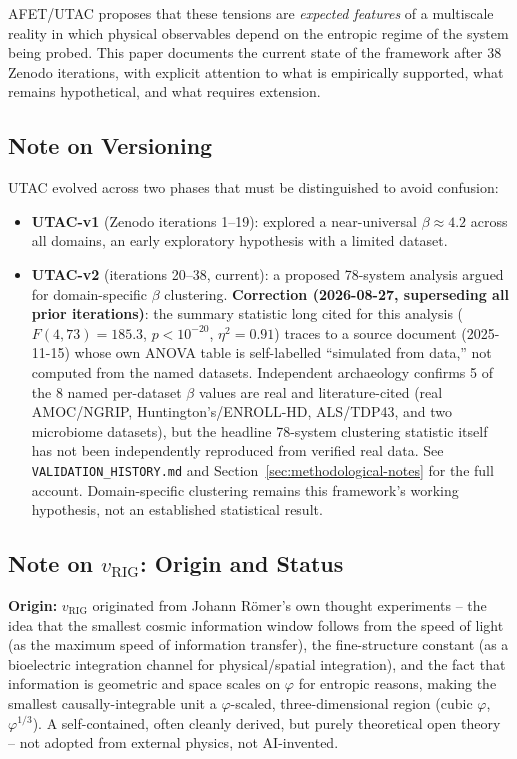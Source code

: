 \documentclass[12pt,a4paper]{article}
\theoremstyle{definition}
\newcommand{\vrig}{v_{\mathrm{RIG}}}
\newcommand{\phigold}{\varphi}   %
\begin{document}
AFET/UTAC proposes that these tensions are \emph{expected features} of a multiscale
reality in which physical observables depend on the entropic regime of the system being
probed. This paper documents the current state of the framework after 38 Zenodo iterations,
with explicit attention to what is empirically supported, what remains hypothetical, and
what requires extension.

\subsection*{Note on Versioning}

UTAC evolved across two phases that must be distinguished to avoid confusion:
\begin{itemize}[leftmargin=1.8em]
  \item \textbf{UTAC-v1} (Zenodo iterations 1--19): explored a near-universal $\beta \approx 4.2$
        across all domains, an early exploratory hypothesis with a limited dataset.
  \item \textbf{UTAC-v2} (iterations 20--38, current): a proposed 78-system analysis
        argued for domain-specific $\beta$ clustering. \textbf{Correction (2026-08-27,
        superseding all prior iterations)}: the summary statistic long cited for this
        analysis ($F(4,73)=185.3$, $p<10^{-20}$, $\eta^2=0.91$) traces to a source
        document (2025-11-15) whose own ANOVA table is self-labelled ``simulated from
        data,'' not computed from the named datasets. Independent archaeology confirms
        5 of the 8 named per-dataset $\beta$ values are real and literature-cited
        (real AMOC/NGRIP, Huntington's/ENROLL-HD, ALS/TDP43, and two microbiome
        datasets), but the headline 78-system clustering statistic itself has not been
        independently reproduced from verified real data. See
        \texttt{VALIDATION\_HISTORY.md} and Section~\ref{sec:methodological-notes} for
        the full account. Domain-specific clustering remains this framework's working
        hypothesis, not an established statistical result.
\end{itemize}

\subsection*{Note on \texorpdfstring{$\vrig$}{v\_RIG}: Origin and Status}

\textbf{Origin:} $\vrig$ originated from Johann R\"omer's own thought
experiments -- the idea that the smallest cosmic information window
follows from the speed of light (as the maximum speed of information
transfer), the fine-structure constant (as a bioelectric integration
channel for physical/spatial integration), and the fact that information
is geometric and space scales on $\phigold$ for entropic reasons, making
the smallest causally-integrable unit a $\phigold$-scaled, three-dimensional
region (cubic $\phigold$, $\phigold^{1/3}$). A self-contained, often
cleanly derived, but purely theoretical open theory -- not adopted from
external physics, not AI-invented.
\end{document}

